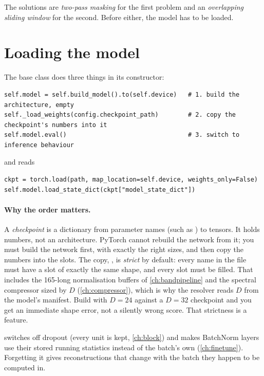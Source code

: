 The solutions are \emph{two-pass masking} for the first problem and an \emph{overlapping sliding window}
for the second. Before either, the model has to be loaded.

\section{Loading the model}\label{sec:inference:loading}

The base class  does three things in its constructor:
\begin{lstlisting}
self.model = self.build_model().to(self.device)   # 1. build the architecture, empty
self._load_weights(config.checkpoint_path)        # 2. copy the checkpoint's numbers into it
self.model.eval()                                 # 3. switch to inference behaviour
\end{lstlisting}
and  reads
\begin{lstlisting}
ckpt = torch.load(path, map_location=self.device, weights_only=False)
self.model.load_state_dict(ckpt["model_state_dict"])
\end{lstlisting}

\paragraph{Why the order matters.}
A \emph{checkpoint} is a dictionary from parameter names (such as
) to tensors. It holds numbers, not an architecture. PyTorch cannot
rebuild the network from it; you must build the network first, with exactly the right sizes, and then copy
the numbers into the slots. The copy, , is \emph{strict} by default: every name in the
file must have a slot of exactly the same shape, and every slot must be filled. That includes the 165-long
normalisation buffers of \cref{ch:bandpipeline} and the spectral compressor sized by $D$
(\cref{ch:compressor}), which is why the resolver reads $D$ from the model's manifest. Build with $D=24$
against a $D=32$ checkpoint and you get an immediate shape error, not a silently wrong score. That
strictness is a feature.

 switches off dropout (every unit is kept, \cref{ch:block}) and makes BatchNorm layers
use their stored running statistics instead of the batch's own (\cref{ch:finetune}). Forgetting it gives
reconstructions that change with the batch they happen to be computed in.

